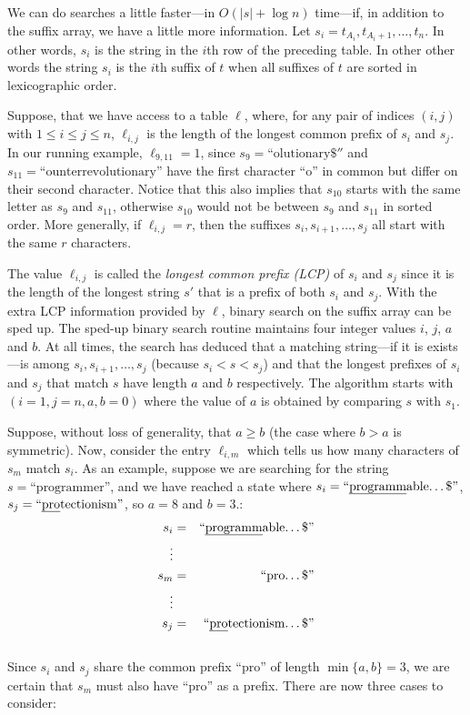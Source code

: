 We can do searches a little faster---in $O(|s|+\log n)$ time---if,
in addition to the suffix array, we have a little more information.
Let $s_i=t_{A_i}, t_{A_i+1},\ldots,t_{n}$. In other words, $s_i$ is the
string in the $i$th row of the preceding table. In other other words
the string $s_i$ is the $i$th suffix of $t$ when all suffixes of $t$
are sorted in lexicographic order.

Suppose, that we have access to a table $\ell$, where, for any
pair of indices $(i,j)$ with $1\le i\le j\le n$, $\ell_{i,j}$ is
the length of the longest common prefix of $s_i$ and $s_j$. In our
running example, $\ell_{9,11}=1$, since $s_9=\text{``olutionary\$}''$
and $s_{11}=\text{``ounterrevolutionary''}$ have the first character
``o'' in common but differ on their second character. Notice that
this also implies that $s_{10}$ starts with the same letter as $s_9$
and $s_{11}$, otherwise $s_{10}$ would not be between $s_9$ and $s_{11}$
in sorted order.  More generally, if $\ell_{i,j}=r$, then the suffixes
$s_i,s_{i+1},\ldots,s_{j}$ all start with the same $r$ characters.

The value $\ell_{i,j}$ is called the \emph{longest common prefix (LCP)}
of $s_i$ and $s_j$ since it is the length of the longest string $s'$
that is a prefix of both $s_i$ and $s_j$.  With the extra LCP information
provided by $\ell$, binary search on the suffix array can be sped up.
The sped-up binary search routine maintains four integer values $i$,
$j$, $a$ and $b$.  At all times, the search has deduced that a matching
string---if it is exists---is among $s_i,s_{i+1},\ldots,s_j$ (because
$s_i < s < s_j$) and that the longest prefixes of $s_i$ and $s_j$ that
match $s$ have length $a$ and $b$ respectively. The algorithm starts with
$(i=1,j=n,a,b=0)$ where the value of $a$ is obtained by comparing $s$
with $s_1$.

Suppose, without loss of generality, that $a \ge b$ (the case where $b>a$ is symmetric).  Now, consider the entry $\ell_{i,m}$ which tells us how many characters of $s_m$ match $s_i$. 
As an example, suppose we are searching for the string $s=\text{``programmer''}$, and we have reached a state where $s_i=\text{``\uline{programm}able\ldots\$''}$, $s_j=\text{``\uline{pro}tectionism''}$, so $a=8$ and $b=3$.: \\[\parskip]
  \begin{eqnarray*}
     s_i & = & \text{``\uline{programm}able\ldots\$''} \\
     \vdots & \\
     s_m & = & \text{``pro\ldots\$''} \\
     \vdots & \\
     s_j & = & \text{``\uline{pro}tectionism\ldots\$''} \\
  \end{eqnarray*} \\[\parskip]
Since $s_i$ and $s_j$ share the common prefix ``pro'' of length $\min\{a,b\}=3$, we are certain that $s_m$ must also have ``pro'' as a prefix.
There are now three cases to consider:

